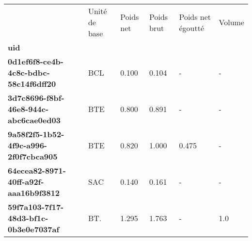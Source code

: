 \begin{tabularx}{\linewidth}{lXXXXX}
\toprule
{} & Unité de base &  Poids net &  Poids brut &  Poids net égoutté &  Volume \\
\textbf{uid                                 } &               &            &             &                    &         \\
\midrule
\textbf{0d1ef6f8-ce4b-4c8c-bdbc-58c14f6dff20} &           BCL &      0.100 &       0.104 &                  - &       - \\
\textbf{3d7c8696-f8bf-46e8-944c-abc6cae0ed03} &           BTE &      0.800 &       0.891 &                  - &       - \\
\textbf{9a58f2f5-1b52-4f9c-a996-2f0f7cbca905} &           BTE &      0.820 &       1.000 &              0.475 &       - \\
\textbf{64ecea82-8971-40ff-a92f-aaa16b9f3812} &           SAC &      0.140 &       0.161 &                  - &       - \\
\textbf{59f7a103-7f17-48d3-bf1c-0b3e0e7037af} &           BT. &      1.295 &       1.763 &                  - &     1.0 \\
\bottomrule
\end{tabularx}
